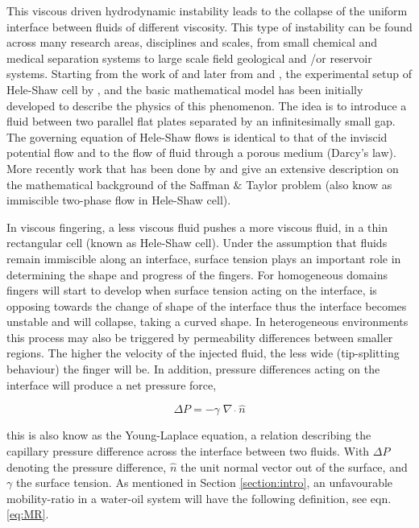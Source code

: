 \documentclass[preprint,authoryear,12pt]{elsarticle}
\begin{document}
\medskip
This viscous driven hydrodynamic instability leads to the collapse of the uniform interface between fluids of different viscosity. This type of instability can be found across many research areas, disciplines and scales, from small chemical and medical separation systems to large scale field geological and /or reservoir systems. Starting from the work of \citet{muskat_1934} and later from \citet{saffman_1959} and \citet{homsy_1987}, the experimental setup of Hele-Shaw cell by \citet{saffman_1986}, and the basic mathematical model has been initially developed to describe the physics of this phenomenon. The idea is to introduce a fluid between two parallel flat plates separated by an infinitesimally small gap. The governing equation of Hele-Shaw flows is identical to that of the inviscid potential flow and to the flow of fluid through a porous medium (Darcy's law). More recently work that has been done by \citet{howison_2000} and \citet{praud_2005} give an extensive description on the mathematical background of the Saffman $\&$ Taylor problem (also know as immiscible two-phase flow in Hele-Shaw cell). 

\medskip
In viscous fingering, a less viscous fluid pushes a more viscous fluid, in a thin rectangular cell (known as Hele-Shaw cell). \citet{howison_2000}  Under the assumption that fluids remain immiscible along an interface, surface tension plays an important role in determining the shape and progress of the fingers. For homogeneous domains fingers will start to develop when surface tension acting on the interface, is opposing towards the change of shape of the interface thus the interface becomes unstable and will collapse, taking a curved shape. In heterogeneous environments this process may also be triggered by permeability differences between smaller regions. The higher the velocity of the injected fluid, the less wide (tip-splitting behaviour) the finger will be. In addition, pressure differences %
acting on the interface will produce a net pressure force,  

\begin{equation}
\Delta P= - \gamma \; \nabla \; \dot \; \hat{n} 
\label{eq:pressure_dif} 
\end{equation}

\noindent this is also know as the Young-Laplace equation, a relation describing the capillary pressure difference across the interface between two fluids. With $\Delta P$ denoting the pressure difference, $\hat{n}$ the unit normal vector out of the surface, and $\gamma$ the surface tension. As mentioned in Section \ref{section:intro}, an unfavourable mobility-ratio in a water-oil system will have the following definition, see eqn.\ref{eq:MR}.
\end{document}
